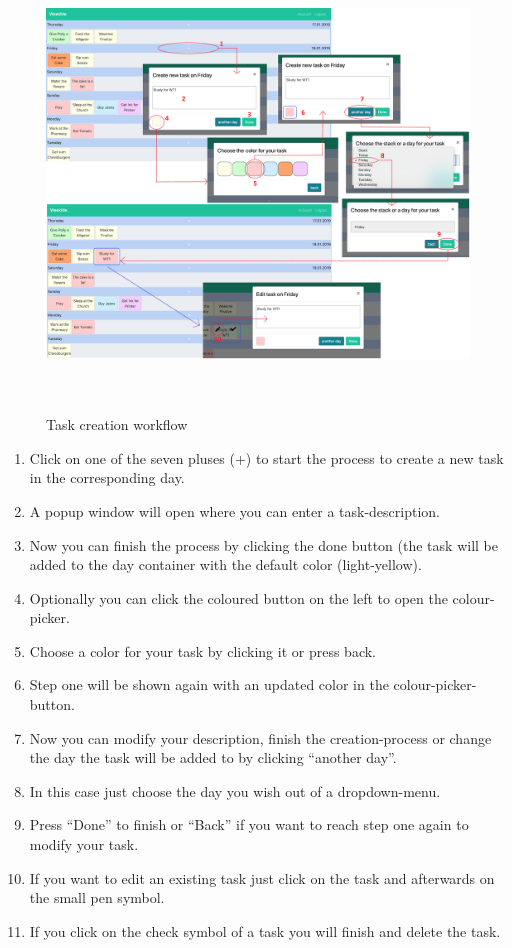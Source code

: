 	\begin{figure}[H] 
		\centering 
		\includegraphics[height=12cm]{figures/task_creation_workflow}    
		\caption[Task creation workflow]{Task creation workflow}     
		\label{fig: Task creation workflow}     
	\end{figure}  
\newpage	
\begin{enumerate}
	\item Click on one of the seven pluses (+) to start the process to create a new task in the corresponding day. 
	\item A popup window will open where you can enter a task-description.
	\item Now you can finish the process by clicking the done button (the task will be added to the day container with the default color (light-yellow). 
	\item Optionally you can click the coloured button on the left to open the colour-picker.
	\item Choose a color for your task by clicking it or press back. 
	\item Step one will be shown again with an updated color in the colour-picker-button.
	\item Now you can modify your description, finish the creation-process or change the day the task will be added to by clicking “another day”.
	\item In this case just choose the day you wish out of a dropdown-menu.
	\item Press “Done” to finish or “Back” if you want to reach step one again to modify your task.
	\item If you want to edit an existing task just click on the task and afterwards on the small pen symbol.
	\item If you click on the check symbol of a task you will finish and delete the task.
\end{enumerate}

